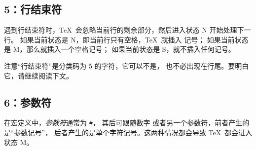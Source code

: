 \documentclass{book}
\begin{document}
\subsection{5：行结束符}

遇到行结束符时，\TeX\ 会忽略当前行的剩余部分，然后进入状态 {\italic N} 开始处理下一行。
如果当前状态是 {\italic N}，即当前行只有空格，\TeX\ 就插入  记号；
如果当前状态是 {\italic M}，那么就插入一个空格记号；
如果当前状态是 {\italic S}，就不插入任何记号。

注意“行结束符”是分类码为 5 的字符，它可以不是，
也不必出现在行尾。要明白它，请继续阅读下文。

\subsection{6：参数符}

在宏定义中，{\em 参数符}通常为 \verb=#=，
其后可跟随数字  或者另一个参数符，前者产生的是“参数记号”，
后者产生的是单个字符记号。这两种情况都会导致 \TeX\ 都会进入状态 {\italic M}。
\end{document}
